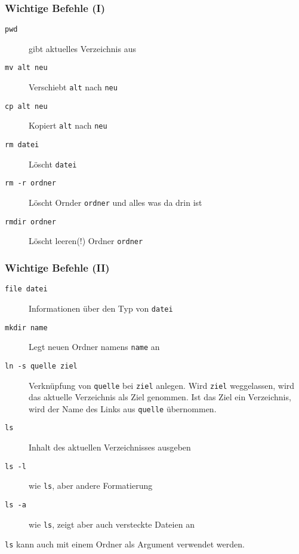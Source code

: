     \begin{frame}
        \frametitle{Wichtige Befehle (I)}
        \begin{description}
            \item[\texttt{pwd}] gibt aktuelles Verzeichnis aus
            \item[\texttt{mv alt neu}] Verschiebt \texttt{alt} nach \texttt{neu}
            \item[\texttt{cp alt neu}] Kopiert \texttt{alt} nach \texttt{neu}
            \item[\texttt{rm datei}] Löscht \texttt{datei}
            \item[\texttt{rm -r ordner}] Löscht Ornder \texttt{ordner} und alles
                was da drin ist
            \item[\texttt{rmdir ordner}] Löscht leeren(!) Ordner \texttt{ordner}
        \end{description}
    \end{frame}

    \begin{frame}
        \frametitle{Wichtige Befehle (II)}
        \begin{description}
            \item[\texttt{file datei}] Informationen über den Typ von \texttt{datei}
            \item[\texttt{mkdir name}] Legt neuen Ordner namens \texttt{name} an
            \item[\texttt{ln -s quelle ziel}] Verknüpfung von \texttt{quelle}
                bei \texttt{ziel} anlegen. Wird \texttt{ziel} weggelassen, wird
                das aktuelle Verzeichnis als Ziel genommen. Ist das Ziel ein
                Verzeichnis, wird der Name des Links aus \texttt{quelle}
                übernommen.
            \item[\texttt{ls}] Inhalt des aktuellen Verzeichnisses ausgeben
            \item[\texttt{ls -l}] wie \texttt{ls}, aber andere Formatierung
            \item[\texttt{ls -a}] wie \texttt{ls}, zeigt aber auch versteckte
                Dateien an
        \end{description}
        \texttt{ls} kann auch mit einem Ordner als Argument verwendet werden.
    \end{frame}

